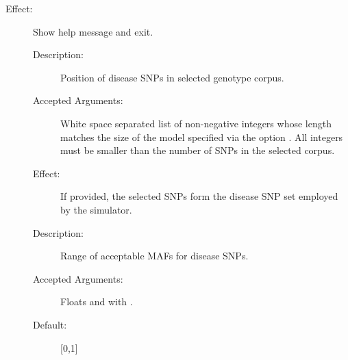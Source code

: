\documentclass[a4paper,10pt,english]{sphinxhowto}
\begin{document}
\begin{description}
\begin{description}
\begin{description}
\end{description}

\item[{\sphinxcode{\sphinxupquote{-h, -{-}help}}}] \leavevmode\begin{description}
\item[{Effect:}] \leavevmode
Show help message and exit.

\end{description}

\end{description}

\item[{\sphinxstylestrong{Optional Mutually Exclusive Arguments:}}] \leavevmode\begin{description}
\item[{}] \leavevmode\begin{description}
\item[{Description:}] \leavevmode
Position of disease SNPs in selected genotype corpus.

\item[{Accepted Arguments:}] \leavevmode
White space separated list of non-negative integers whose length matches the size of the model specified
via the option . All integers must be smaller than the number of SNPs in the selected corpus.

\item[{Effect:}] \leavevmode
If provided, the selected SNPs form the disease SNP set employed by the simulator.

\end{description}

\item[{}] \leavevmode\begin{description}
\item[{Description:}] \leavevmode
Range of acceptable MAFs for disease SNPs.

\item[{Accepted Arguments:}] \leavevmode
Floats  and  with .

\item[{Default:}] \leavevmode
{[}0,1{]}


\end{description}
\end{description}
\end{description}
\end{document}
